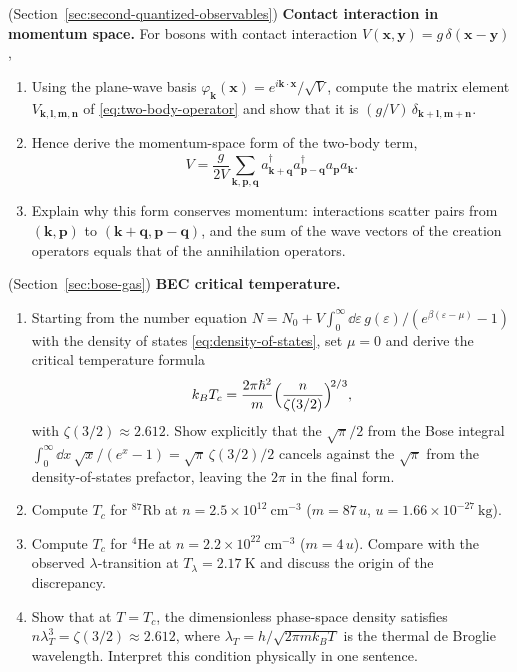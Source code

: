 \begin{problemset}
\item (Section~\ref{sec:second-quantized-observables}) \textbf{Contact interaction in momentum space.}
    For bosons with contact interaction $V(\bm x, \bm y) = g\,\delta(\bm x - \bm y)$,
    \begin{enumerate}
        \item[(a)] Using the plane-wave basis $\varphi_{\bm k}(\bm x) = e^{i\bm k\cdot\bm x}/\sqrt{V}$, compute the matrix element $V_{\bm k, \bm l, \bm m, \bm n}$ of \eqref{eq:two-body-operator} and show that it is $(g/V)\,\delta_{\bm k + \bm l, \bm m + \bm n}$.
        \item[(b)] Hence derive the momentum-space form of the two-body term,
        \begin{equation*}
            V = \frac{g}{2V}\sum_{\bm k, \bm p, \bm q}
                a_{\bm k + \bm q}^\dagger a_{\bm p - \bm q}^\dagger a_{\bm p} a_{\bm k}.
        \end{equation*}
        \item[(c)] Explain why this form conserves momentum: interactions scatter pairs from $(\bm k, \bm p)$ to $(\bm k + \bm q, \bm p - \bm q)$, and the sum of the wave vectors of the creation operators equals that of the annihilation operators.
    \end{enumerate}

\item (Section~\ref{sec:bose-gas}) \textbf{BEC critical temperature.}
    \begin{enumerate}
        \item[(a)] Starting from the number equation $N = N_0 + V\int_0^\infty\!\dd\varepsilon\,g(\varepsilon)/(e^{\beta(\varepsilon - \mu)} - 1)$ with the density of states \eqref{eq:density-of-states}, set $\mu = 0$ and derive the critical temperature formula
        \begin{equation*}
            k_B T_c = \frac{2\pi\hbar^2}{m}\Bigl(\frac{n}{\zeta(3/2)}\Bigr)^{\!2/3},
        \end{equation*}
        with $\zeta(3/2) \approx 2.612$. Show explicitly that the $\sqrt{\pi}/2$ from the Bose integral $\int_0^\infty\!\dd x\,\sqrt{x}/(e^x - 1) = \sqrt{\pi}\,\zeta(3/2)/2$ cancels against the $\sqrt{\pi}$ from the density-of-states prefactor, leaving the $2\pi$ in the final form.
        \item[(b)] Compute $T_c$ for $^{87}$Rb at $n = 2.5 \times 10^{12}\ \text{cm}^{-3}$ ($m = 87\,u$, $u = 1.66 \times 10^{-27}\ \text{kg}$).
        \item[(c)] Compute $T_c$ for $^4$He at $n = 2.2 \times 10^{22}\ \text{cm}^{-3}$ ($m = 4\,u$). Compare with the observed $\lambda$-transition at $T_\lambda = 2.17\ \text{K}$ and discuss the origin of the discrepancy.
        \item[(d)] Show that at $T = T_c$, the dimensionless phase-space density satisfies $n\lambda_T^3 = \zeta(3/2) \approx 2.612$, where $\lambda_T = h/\sqrt{2\pi m k_B T}$ is the thermal de Broglie wavelength. Interpret this condition physically in one sentence.
    \end{enumerate}


\end{problemset}
